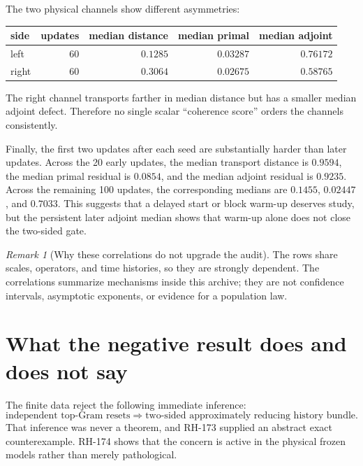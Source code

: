 \documentclass[12pt]{article}
\theoremstyle{remark}
\newtheorem{remark}[theorem]{Remark}
\begin{document}
The two physical channels show different asymmetries:
\begin{center}
\begin{tabular}{lrrrr}
\toprule
side & updates & median distance & median primal & median adjoint\\
\midrule
left & 60 & $0.1285$ & $0.03287$ & $0.76172$\\
right & 60 & $0.3064$ & $0.02675$ & $0.58765$\\
\bottomrule
\end{tabular}
\end{center}
The right channel transports farther in median distance but has a smaller
median adjoint defect.  Therefore no single scalar ``coherence score'' orders
the channels consistently.

Finally, the first two updates after each seed are substantially harder than
later updates.  Across the 20 early updates, the median transport distance is
$0.9594$, the median primal residual is $0.0854$, and the median adjoint
residual is $0.9235$.  Across the remaining 100 updates, the corresponding
medians are $0.1455$, $0.02447$, and $0.7033$.  This suggests that a delayed
start or block warm-up deserves study, but the persistent later adjoint median
shows that warm-up alone does not close the two-sided gate.

\begin{remark}[Why these correlations do not upgrade the audit]
The rows share scales, operators, and time histories, so they are strongly
dependent.  The correlations summarize mechanisms inside this archive; they
are not confidence intervals, asymptotic exponents, or evidence for a
population law.
\end{remark}

\section{What the negative result does and does not say}

The finite data reject the following immediate inference:
\[
 \text{independent top-Gram resets}
 \Longrightarrow
 \text{two-sided approximately reducing history bundle}.
\]
That inference was never a theorem, and RH-173 supplied an abstract exact
counterexample.  RH-174 shows that the concern is active in the physical
frozen models rather than merely pathological.
\end{document}
